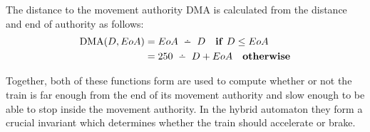 \begin{mydef}

The distance to the movement authority $\mathrm{DMA}$ is calculated from the distance and end of authority as follows:
\begin{align*}
\DMA{D}{EoA} & = EoA \Monus D \quad \mathbf{if} \ D \leq EoA \\
                         & = 250 \Monus D + EoA \quad \mathbf{otherwise}
\end{align*}



\end{mydef}

Together, both of these functions form are used to compute whether or not the train is far enough from the end of its movement authority and slow enough to be able to stop inside the movement authority. In the hybrid automaton they form a crucial invariant which determines whether the train should accelerate or brake.

